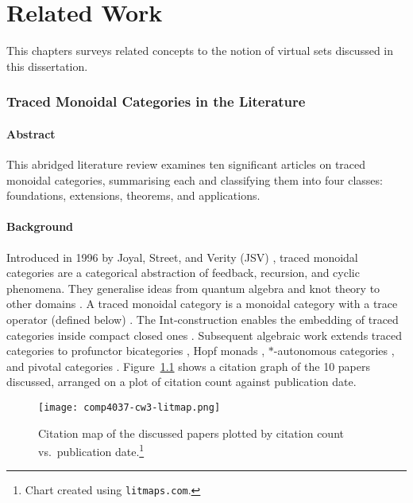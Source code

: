 \chapter{Related Work} \label{related-work}

This chapters surveys related concepts to the notion of virtual sets
discussed in this dissertation.

\subsection{Traced Monoidal Categories in the Literature}
\subsubsection*{Abstract}
This abridged literature review examines ten significant articles on traced
monoidal categories, summarising each and classifying them into four classes:
foundations, extensions, theorems, and applications.
\subsubsection*{Background}
Introduced in 1996 by Joyal, Street, and Verity (JSV)
\cite{joyal1996-traced-monoidal-categories}, traced monoidal categories are a
categorical abstraction of feedback, recursion, and cyclic phenomena. They
generalise ideas from quantum algebra and knot theory to other domains
\cite{reshetikhin1990-ribbon-graphs-invaraints}. A traced monoidal category is a
monoidal category with a trace operator (defined below)
\cite{hu2021-traced-monoidal-categories}. The $\mathrm{Int}$-construction
enables the embedding of traced categories inside compact closed ones
\cite{joyal1996-traced-monoidal-categories}. Subsequent algebraic work extends
traced categories to profunctor bicategories
\cite{hu2021-traced-monoidal-categories}, Hopf monads
\cite{bruguieres2011-hopf-monads-monoidal}, $*$-autonomous categories
\cite{hajgato2013-traced-autonomous-categories}, and pivotal categories
\cite{etingof2005-fusion-categories}. Figure~\ref{fig:litmap} shows a citation graph of the
10 papers discussed, arranged on a plot of citation count against publication
date.
\begin{figure}[ht]
	\centering
	\texttt{[image: comp4037-cw3-litmap.png]}
	\caption{Citation map of the discussed papers plotted by citation count vs.\ publication date.\protect\footnote{Chart created using \texttt{litmaps.com}.}}
	\label{fig:litmap}
\end{figure}

